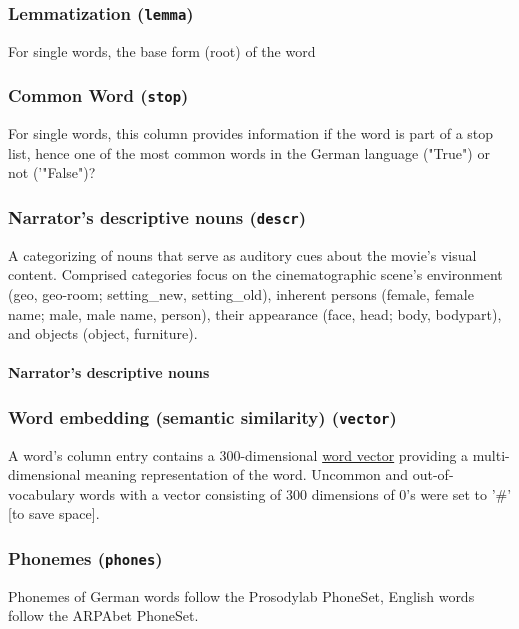 \documentclass[10pt,a4paper,twocolumn]{article}
\begin{document}
\subsubsection*{Lemmatization (\texttt{lemma})}
For single words, the base form (root) of the word
\subsubsection*{Common Word (\texttt{stop})}
For single words, this column provides information if the word is part of a stop list, hence one of the most common words in the German language ("True") or not ('"False")?
\subsubsection*{Narrator's descriptive nouns (\texttt{descr})}
A categorizing of nouns that serve as auditory cues about the movie's visual content. Comprised categories focus on the cinematographic scene's environment (geo, geo-room; setting\_new, setting\_old), inherent persons (female, female name; male, male name, person), their appearance (face, head; body, bodypart), and objects (object, furniture).
\paragraph*{Narrator's descriptive nouns}
\subsubsection*{Word embedding (semantic similarity) (\texttt{vector})}
A word's column entry contains a 300-dimensional \href{https://en.wikipedia.org/wiki/Word2vec}{word vector} providing a multi-dimensional meaning representation of the word. Uncommon and out-of-vocabulary words with a vector consisting of 300 dimensions of 0's were set to '\#' [to save space].

\subsubsection*{Phonemes (\texttt{phones})}
Phonemes of German words follow the Prosodylab PhoneSet, English words follow the ARPAbet PhoneSet.
\end{document}
